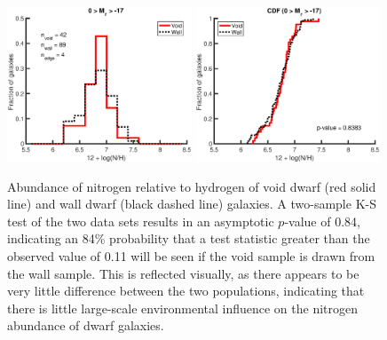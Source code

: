 
\begin{figure}
    \centering
    \includegraphics[width=0.49\textwidth]{Images/Paper2/1sig_dwarf_SF_t3_12logNH_hist}
    \includegraphics[width=0.49\textwidth]{Images/Paper2/1sig_dwarf_SF_t3_12logNH_CDF}
    \caption[Nitrogen distribution of 135 dwarf galaxy sample]{Abundance of 
    nitrogen relative to hydrogen of void dwarf (red solid line) and wall dwarf 
    (black dashed line) galaxies.  A two-sample K-S test of the two data sets 
    results in an asymptotic $p$-value of 0.84, indicating an 84\% probability 
    that a test statistic greater than the observed value of 0.11 will be seen 
    if the void sample is drawn from the wall sample.  This is reflected 
    visually, as there appears to be very little difference between the two 
    populations, indicating that there is little large-scale environmental 
    influence on the nitrogen abundance of dwarf galaxies.}
    \label{fig:N_1sig}
\end{figure}


